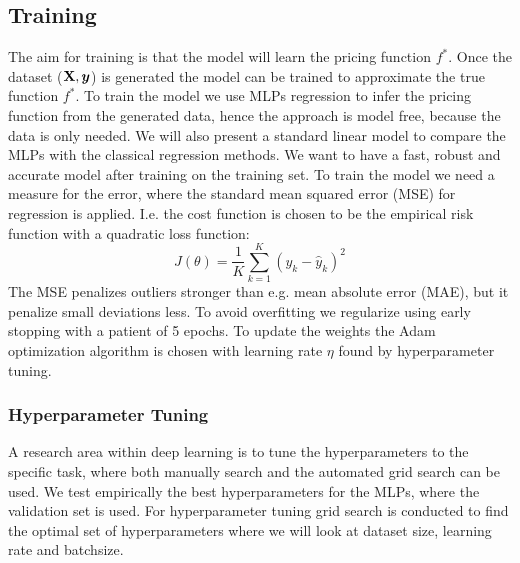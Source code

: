 \subsection{Training}
The aim for training is that the model will learn the pricing function $f^*$. Once the dataset ($\mathbf{X}, \bm{y}$) is generated the model can be trained to approximate the true function $f^*$. To train the model we use MLPs regression to infer the pricing function from the generated data, hence the approach is model free, because the data is only needed. We will also present a standard linear model to compare the MLPs with the classical regression methods. We want to have a fast, robust and accurate model after training on the training set. To train the model we need a measure for the error, where the standard mean squared error (MSE) for regression is applied. I.e. the cost function is chosen to be the empirical risk function with a quadratic loss function:
$$J(\theta)= \frac{1}{K} \sum_{k=1}^{K}(y_k-\hat{y}_k)^2$$
The MSE penalizes outliers stronger than e.g. mean absolute error (MAE), but it penalize small deviations less. To avoid overfitting we regularize using early stopping with a patient of 5 epochs. To update the weights the Adam optimization algorithm is chosen with learning rate $\eta$ found by hyperparameter tuning. \\

\subsubsection{Hyperparameter Tuning}
A research area within deep learning is to tune the hyperparameters to the specific task, where both manually search and the automated grid search can be used. We test empirically the best hyperparameters for the MLPs, where the validation set is used. For hyperparameter tuning grid search is conducted to find the optimal set of hyperparameters where we will look at dataset size, learning rate and batchsize.\\

